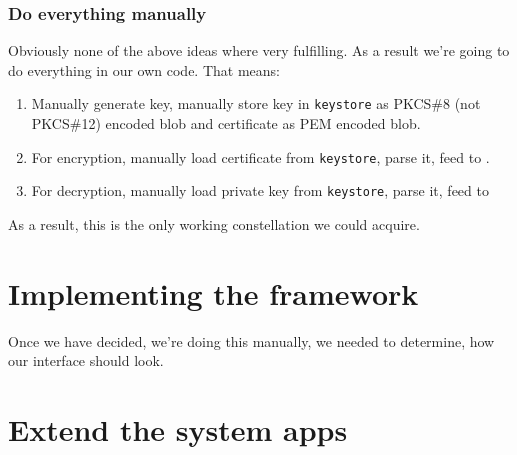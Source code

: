 \documentclass[a4paper]{scrartcl}
\begin{document}
		\subsubsection{Do everything manually}
			Obviously none of the above ideas where very fulfilling. As a result we're going to do everything in our own code. That means:
			\begin{enumerate}
				\item Manually generate key, manually store key in \texttt{keystore} as PKCS\#8 (not PKCS\#12) encoded blob and certificate as PEM encoded blob.
				\item For encryption, manually load certificate from \texttt{keystore}, parse it, feed to .
				\item For decryption, manually load private key from \texttt{keystore}, parse it, feed to 
			\end{enumerate}
			As a result, this is the only working constellation we could acquire.

\section{Implementing the framework}
Once we have decided, we're doing this manually, we needed to determine, how our interface should look.

\section{Extend the system apps}
\end{document}
